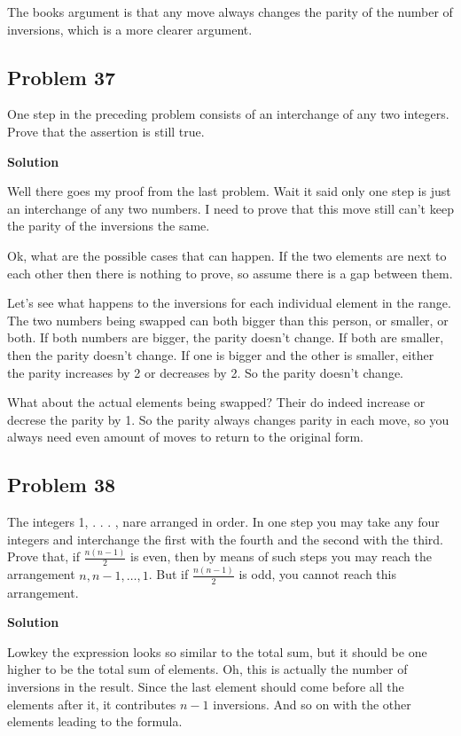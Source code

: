 \documentclass[12pt,tikz,border=10pt]{article}
\theoremstyle{definition}
\theoremstyle{remark}
\begin{document}
The books argument is that any move always changes the parity of the number of inversions,
which is a more clearer argument.

\subsection{Problem 37}

One step in the preceding problem consists of an interchange of any two integers.
Prove that the assertion is still true.

\textbf{Solution}

Well there goes my proof from the last problem. Wait it said only one step is 
just an interchange of any two numbers. I need to prove that this move still can't 
keep the parity of the inversions the same.

Ok, what are the possible cases that can happen. If the two elements are next to each
other then there is nothing to prove, so assume there is a gap between them.

Let's see what happens to the inversions for each individual element in the range.
The two numbers being swapped can both bigger than this person, or smaller, or both. If both
numbers are bigger, the parity doesn't change. If both are smaller, then the parity doesn't change.
If one is bigger and the other is smaller, either the parity increases by 2 or decreases by 2. So the parity doesn't change.

What about the actual elements being swapped? Their do indeed increase or decrese the parity by 1. So 
the parity always changes parity in each move, so you always need even amount of moves to return to the original form.

\subsection{Problem 38}

The integers 1, . . . , nare arranged in order. In one step you may take any four integers
and interchange the first with the fourth and the second with the third. Prove that,
if $\frac{n(n-1)}{2}$ is even, then by means of such steps you may reach the arrangement
$n, n-1, \ldots, 1$. But if $\frac{n(n-1)}{2}$ is odd, you cannot reach this arrangement.

\textbf{Solution}

Lowkey the expression looks so similar to the total sum, but it should be one higher to be the 
total sum of elements. Oh, this is actually the number of inversions in the result. Since the last element
should come before all the elements after it, it contributes $n-1$ inversions. And so on with the other elements 
leading to the formula.
\end{document}
